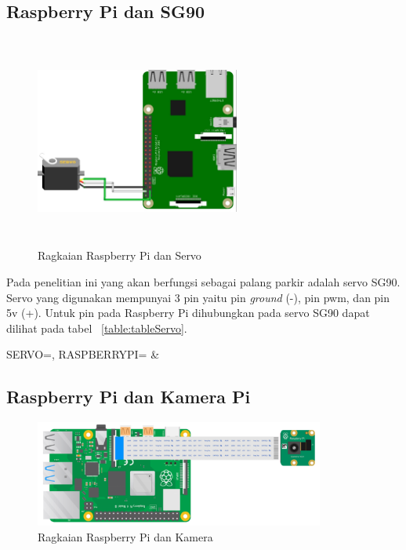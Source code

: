\subsection{Raspberry Pi dan SG90}
\begin{figure} [H]
    \includegraphics[height=7cm, width=0.6\textwidth, center]{images/skematik_servo.jpg}
    \caption{Ragkaian Raspberry Pi dan Servo}
    \label{fig:skematikServo}
\end{figure}

Pada penelitian ini yang akan berfungsi sebagai palang parkir adalah servo SG90. Servo yang digunakan mempunyai 3 pin yaitu pin \textit{ground} (-), pin pwm, dan pin 5v (+). Untuk pin pada Raspberry Pi dihubungkan pada servo SG90 dapat dilihat pada tabel ~\ref{table:tableServo}.

\begin{atable}
    \caption{Rangkaian pin Servo ke Raspberry Pi}
    \label{table:tableServo}
        {
            SERVO=\SERVO, 
            RASPBERRYPI=\RASPBERRYPI}
        {
            \SERVO & 
            \RASPBERRYPI}
\end{atable}

\subsection{Raspberry Pi dan Kamera Pi}
\begin{figure} [H]
    \includegraphics[width=0.85\textwidth, center]{images/skematik-kamera.png}
    \caption{Ragkaian Raspberry Pi dan Kamera}
    \label{fig:skematikKamera}
\end{figure}

